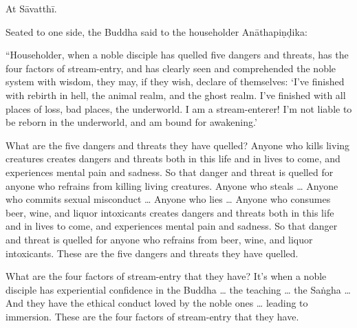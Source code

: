 \documentclass[12pt,openany]{book}%
\begin{document}
At \textsanskrit{Sāvatthī}. 

Seated to one side, the Buddha said to the householder \textsanskrit{Anāthapiṇḍika}: 

“Householder, when a noble disciple has quelled five dangers and threats, has the four factors of stream-entry, and has clearly seen and comprehended the noble system with wisdom, they may, if they wish, declare of themselves: ‘I’ve finished with rebirth in hell, the animal realm, and the ghost realm. I’ve finished with all places of loss, bad places, the underworld. I am a stream-enterer! I’m not liable to be reborn in the underworld, and am bound for awakening.’ 

What are the five dangers and threats they have quelled? Anyone who kills living creatures creates dangers and threats both in this life and in lives to come, and experiences mental pain and sadness. So that danger and threat is quelled for anyone who refrains from killing living creatures. Anyone who steals … Anyone who commits sexual misconduct … Anyone who lies … Anyone who consumes beer, wine, and liquor intoxicants creates dangers and threats both in this life and in lives to come, and experiences mental pain and sadness. So that danger and threat is quelled for anyone who refrains from beer, wine, and liquor intoxicants. These are the five dangers and threats they have quelled. 

What are the four factors of stream-entry that they have? It’s when a noble disciple has experiential confidence in the Buddha … the teaching … the \textsanskrit{Saṅgha} … And they have the ethical conduct loved by the noble ones … leading to immersion. These are the four factors of stream-entry that they have. 
\end{document}
